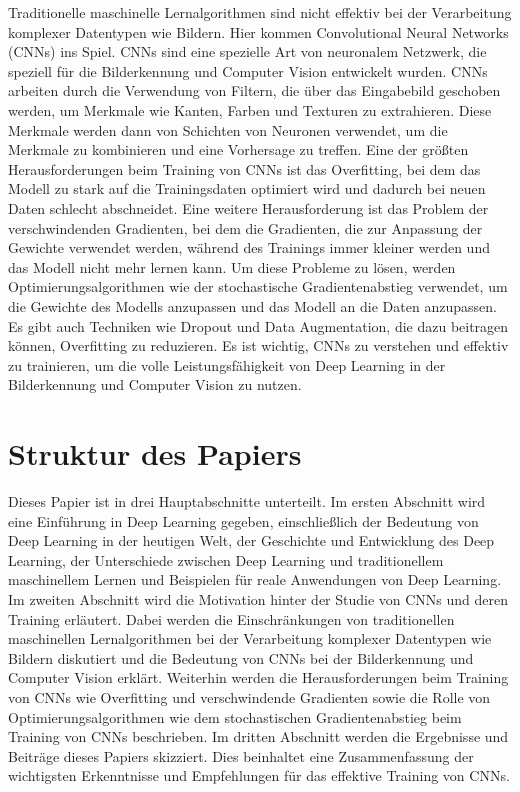 Traditionelle maschinelle Lernalgorithmen sind nicht effektiv bei der Verarbeitung komplexer Datentypen wie Bildern. Hier kommen Convolutional Neural Networks (CNNs) ins Spiel. CNNs sind eine spezielle Art von neuronalem Netzwerk, die speziell für die Bilderkennung und Computer Vision entwickelt wurden. 
CNNs arbeiten durch die Verwendung von Filtern, die über das Eingabebild geschoben werden, um Merkmale wie Kanten, Farben und Texturen zu extrahieren. Diese Merkmale werden dann von Schichten von Neuronen verwendet, um die Merkmale zu kombinieren und eine Vorhersage zu treffen. 
Eine der größten Herausforderungen beim Training von CNNs ist das Overfitting, bei dem das Modell zu stark auf die Trainingsdaten optimiert wird und dadurch bei neuen Daten schlecht abschneidet. Eine weitere Herausforderung ist das Problem der verschwindenden Gradienten, bei dem die Gradienten, die zur Anpassung der Gewichte verwendet werden, während des Trainings immer kleiner werden und das Modell nicht mehr lernen kann. 
Um diese Probleme zu lösen, werden Optimierungsalgorithmen wie der stochastische Gradientenabstieg verwendet, um die Gewichte des Modells anzupassen und das Modell an die Daten anzupassen. Es gibt auch Techniken wie Dropout und Data Augmentation, die dazu beitragen können, Overfitting zu reduzieren. 
Es ist wichtig, CNNs zu verstehen und effektiv zu trainieren, um die volle Leistungsfähigkeit von Deep Learning in der Bilderkennung und Computer Vision zu nutzen. 

\section{Struktur des Papiers}

Dieses Papier ist in drei Hauptabschnitte unterteilt. Im ersten Abschnitt wird eine Einführung in Deep Learning gegeben, einschließlich der Bedeutung von Deep Learning in der heutigen Welt, der Geschichte und Entwicklung des Deep Learning, der Unterschiede zwischen Deep Learning und traditionellem maschinellem Lernen und Beispielen für reale Anwendungen von Deep Learning.
Im zweiten Abschnitt wird die Motivation hinter der Studie von CNNs und deren Training erläutert. Dabei werden die Einschränkungen von traditionellen maschinellen Lernalgorithmen bei der Verarbeitung komplexer Datentypen wie Bildern diskutiert und die Bedeutung von CNNs bei der Bilderkennung und Computer Vision erklärt. Weiterhin werden die Herausforderungen beim Training von CNNs wie Overfitting und verschwindende Gradienten sowie die Rolle von Optimierungsalgorithmen wie dem stochastischen Gradientenabstieg beim Training von CNNs beschrieben.
Im dritten Abschnitt werden die Ergebnisse und Beiträge dieses Papiers skizziert. Dies beinhaltet eine Zusammenfassung der wichtigsten Erkenntnisse und Empfehlungen für das effektive Training von CNNs.